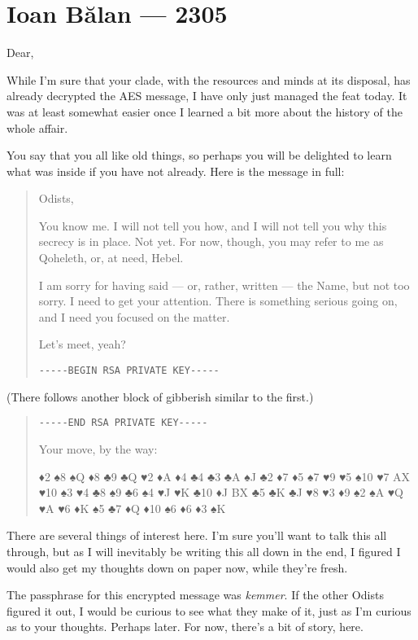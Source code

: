 \hypertarget{ioan-bux103lan-2305}{%
\chapter*{Ioan Bălan — 2305}\label{ioan-bux103lan-2305}}

Dear,

While I'm sure that your clade, with the resources and minds at its disposal, has already decrypted the AES message, I have only just managed the feat today. It was at least somewhat easier once I learned a bit more about the history of the whole affair.

You say that you all like old things, so perhaps you will be delighted to learn what was inside if you have not already. Here is the message in full:

\begin{quote}
Odists,

You know me. I will not tell you how, and I will not tell you why this secrecy is in place. Not yet. For now, though, you may refer to me as Qoheleth, or, at need, Hebel.

I am sorry for having said — or, rather, written — the Name, but not too sorry. I need to get your attention. There is something serious going on, and I need you focused on the matter.

Let's meet, yeah?

\texttt{-\/-\/-\/-\/-BEGIN\ RSA\ PRIVATE\ KEY-\/-\/-\/-\/-}
\end{quote}

(There follows another block of gibberish similar to the first.)

\begin{quote}
\texttt{-\/-\/-\/-\/-END\ RSA\ PRIVATE\ KEY-\/-\/-\/-\/-}

Your move, by the way:

♦2 ♠8 ♠Q ♦8 ♣9 ♣Q ♥2 ♦A ♦4 ♣4 ♣3 ♣A ♠J ♣2 ♦7 ♦5 ♠7 ♥9 ♥5 ♠10 ♥7 AX ♥10 ♠3 ♥4 ♣8 ♠9 ♣6 ♠4 ♥J ♥K ♣10 ♦J BX ♣5 ♣K ♣J ♥8 ♥3 ♦9 ♠2 ♠A ♥Q ♥A ♥6 ♦K ♠5 ♣7 ♦Q ♦10 ♠6 ♦6 ♦3 ♠K
\end{quote}

There are several things of interest here. I'm sure you'll want to talk this all through, but as I will inevitably be writing this all down in the end, I figured I would also get my thoughts down on paper now, while they're fresh.

The passphrase for this encrypted message was \emph{kemmer}. If the other Odists figured it out, I would be curious to see what they make of it, just as I'm curious as to your thoughts. Perhaps later. For now, there's a bit of story, here.

